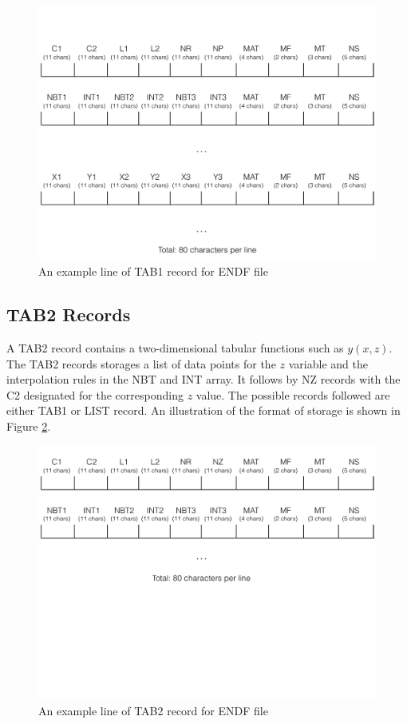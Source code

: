\begin{figure}[h]
\begin{center}
\includegraphics[scale=0.4]{./pics/endf-6-record-tab1.pdf}
\end{center}
\caption{ \label{fig:endf-6-record-tab1}
An example line of TAB1 record for ENDF file}
\end{figure}

\subsection{TAB2 Records}
A TAB2 record contains a two-dimensional tabular functions such as $y(x,z)$. The TAB2 records storages a list of data points for the $z$ variable and the interpolation rules in the NBT and INT array. It follows by NZ records with the C2 designated for the corresponding $z$ value. The possible records followed are either TAB1 or LIST record. An illustration of the format of storage is shown in Figure \ref{fig:endf-6-record-tab2}.

\begin{figure}[h]
\begin{center}
\includegraphics[scale=0.4]{./pics/endf-6-record-tab2.pdf}
\end{center}
\caption{ \label{fig:endf-6-record-tab2}
An example line of TAB2 record for ENDF file}
\end{figure}

